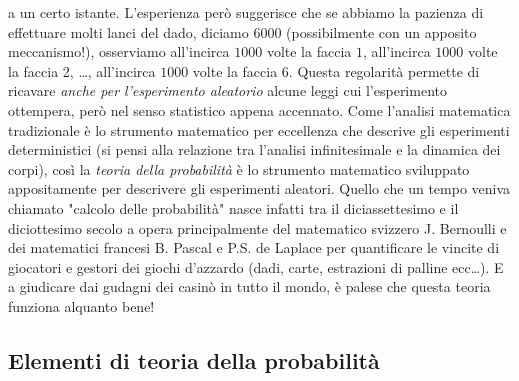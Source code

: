 \documentclass[12pt,oneside,openany]{memoir}
\numberwithin{equation}{subsection}
\begin{document}
a un certo istante. L'esperienza per\`o suggerisce che se abbiamo la pazienza di
effettuare molti lanci del dado, diciamo $6000$ (possibilmente con un apposito
meccanismo!), osserviamo all'incirca $1000$ volte la faccia $1$, all'incirca
$1000$ volte la faccia 2, \dots, all'incirca $1000$ volte la faccia $6$. Questa
regolarit\`a permette di ricavare \textit{anche per l'esperimento aleatorio}
alcune leggi cui l'esperimento ottempera, per\`o nel senso statistico appena
accennato. \bigbreak Come l'analisi matematica tradizionale \`e lo strumento
matematico per eccellenza che descrive gli esperimenti deterministici (si pensi
alla relazione tra l'analisi infinitesimale e la dinamica dei corpi), cos\`i la
\textit{teoria della probabilit\`a} \`e lo strumento matematico sviluppato
appositamente per descrivere gli esperimenti aleatori. Quello che un tempo
veniva chiamato "calcolo delle probabilit\`a" nasce infatti tra il
diciassettesimo e il diciottesimo secolo a opera principalmente del matematico
svizzero J. Bernoulli e dei matematici francesi B. Pascal e P.S. de Laplace per
quantificare le vincite di giocatori e gestori dei giochi d'azzardo (dadi,
carte, estrazioni di palline ecc\dots). E a giudicare dai gudagni dei casin\`o
in tutto il mondo, \`e palese che questa teoria funziona alquanto bene!


\subsection{Elementi di teoria della probabilit\`a}

\end{document}
